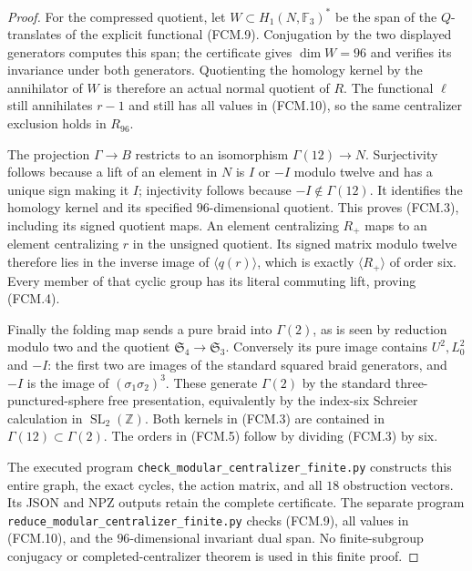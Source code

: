 \begin{proof}
For the compressed quotient, let $W\subset H_1(N,\mathbb F_3)^*$
be the span of the $Q$-translates of the explicit functional
(FCM.9).  Conjugation by the two displayed generators computes
this span; the certificate gives $\dim W=96$ and verifies its
invariance under both generators.  Quotienting the homology
kernel by the annihilator of $W$ is therefore an actual normal
quotient of $R$.  The functional $\ell$ still annihilates $r-1$
and still has all values in (FCM.10), so the same centralizer
exclusion holds in $R_{96}$.

The projection $\Gamma\to B$ restricts to an isomorphism
$\Gamma(12)\to N$.  Surjectivity follows because a lift of an
element in $N$ is $I$ or $-I$ modulo twelve and has a unique sign
making it $I$; injectivity follows because $-I\notin\Gamma(12)$.
It identifies the homology kernel and its specified $96$-dimensional
quotient.  This proves (FCM.3), including its signed quotient maps.
An element centralizing $R_+$ maps to an element centralizing $r$
in the unsigned quotient.  Its signed matrix modulo twelve
therefore lies in the inverse image of $\langle q(r)\rangle$,
which is exactly $\langle R_+\rangle$ of order six.  Every member
of that cyclic group has its literal commuting lift, proving
(FCM.4).

Finally the folding map sends a pure braid into $\Gamma(2)$,
as is seen by reduction modulo two and the quotient
$\mathfrak S_4\to\mathfrak S_3$.  Conversely its pure image contains
$U^2,L_0^2$ and $-I$: the first two are images of the standard
squared braid generators, and $-I$ is the image of
$(\sigma_1\sigma_2)^3$.  These generate $\Gamma(2)$ by the standard
three-punctured-sphere free presentation, equivalently by the
index-six Schreier calculation in $\operatorname{SL}_2(\mathbb Z)$.
Both kernels in (FCM.3) are contained in $\Gamma(12)\subset\Gamma(2)$.
The orders in (FCM.5) follow by dividing (FCM.3) by six.

The executed program \texttt{check\_modular\_centralizer\_finite.py}
constructs this entire graph, the exact cycles, the action matrix,
and all $18$ obstruction vectors.  Its JSON and NPZ outputs retain
the complete certificate.  The separate program
\texttt{reduce\_modular\_centralizer\_finite.py} checks (FCM.9), all
values in (FCM.10), and the $96$-dimensional invariant dual span.
No finite-subgroup conjugacy or completed-centralizer theorem is
used in this finite proof.
\end{proof}
